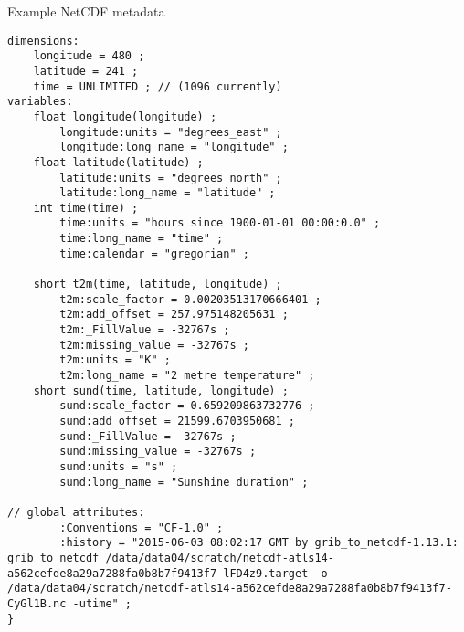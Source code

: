 \begin{tcbcode}[label={lst:NetCDF-data}]{Example NetCDF metadata}
\begin{lstlisting}
dimensions:
	longitude = 480 ;
	latitude = 241 ;
	time = UNLIMITED ; // (1096 currently)
variables:
	float longitude(longitude) ;
		longitude:units = "degrees_east" ;
		longitude:long_name = "longitude" ;
	float latitude(latitude) ;
		latitude:units = "degrees_north" ;
		latitude:long_name = "latitude" ;
	int time(time) ;
		time:units = "hours since 1900-01-01 00:00:0.0" ;
		time:long_name = "time" ;
		time:calendar = "gregorian" ;

	short t2m(time, latitude, longitude) ;
		t2m:scale_factor = 0.00203513170666401 ;
		t2m:add_offset = 257.975148205631 ;
		t2m:_FillValue = -32767s ;
		t2m:missing_value = -32767s ;
		t2m:units = "K" ;
		t2m:long_name = "2 metre temperature" ;
	short sund(time, latitude, longitude) ;
		sund:scale_factor = 0.659209863732776 ;
		sund:add_offset = 21599.6703950681 ;
		sund:_FillValue = -32767s ;
		sund:missing_value = -32767s ;
		sund:units = "s" ;
		sund:long_name = "Sunshine duration" ;

// global attributes:
		:Conventions = "CF-1.0" ;
		:history = "2015-06-03 08:02:17 GMT by grib_to_netcdf-1.13.1: grib_to_netcdf /data/data04/scratch/netcdf-atls14-a562cefde8a29a7288fa0b8b7f9413f7-lFD4z9.target -o /data/data04/scratch/netcdf-atls14-a562cefde8a29a7288fa0b8b7f9413f7-CyGl1B.nc -utime" ;
}
\end{lstlisting}
\end{tcbcode}


